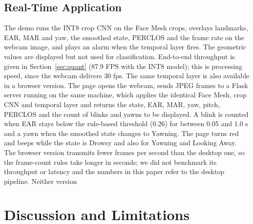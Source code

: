 \documentclass[conference]{IEEEtran}
\begin{document}
\subsection{Real-Time Application}\label{sec:realtime}
The demo runs the INT8 crop CNN on the Face Mesh crops, overlays landmarks, EAR, MAR and yaw, the smoothed state, PERCLOS and the frame rate on the webcam image, and plays an alarm when the temporal layer fires. The geometric values are displayed but not used for classification. End-to-end throughput is given in Section~\ref{sec:quant} (87.9 FPS with the INT8 model); this is processing speed, since the webcam delivers 30 fps.
The same temporal layer is also available in a browser version. The page opens the webcam, sends JPEG frames to a Flask server running on the same machine, which applies the identical Face Mesh, crop CNN and temporal layer and returns the state, EAR, MAR, yaw, pitch, PERCLOS and the count of blinks and yawns to be displayed. A blink is counted when EAR stays below the rule-based threshold (0.26) for between 0.05 and 1.0 s and a yawn when the smoothed state changes to Yawning. The page turns red and beeps while the state is Drowsy and also for Yawning and Looking Away. The browser version transmits fewer frames per second than the desktop one, so the frame-count rules take longer in seconds; we did not benchmark its throughput or latency and the numbers in this paper refer to the desktop pipeline. Neither version 


\vspace{0.2cm}
\section{Discussion and Limitations}
\end{document}
